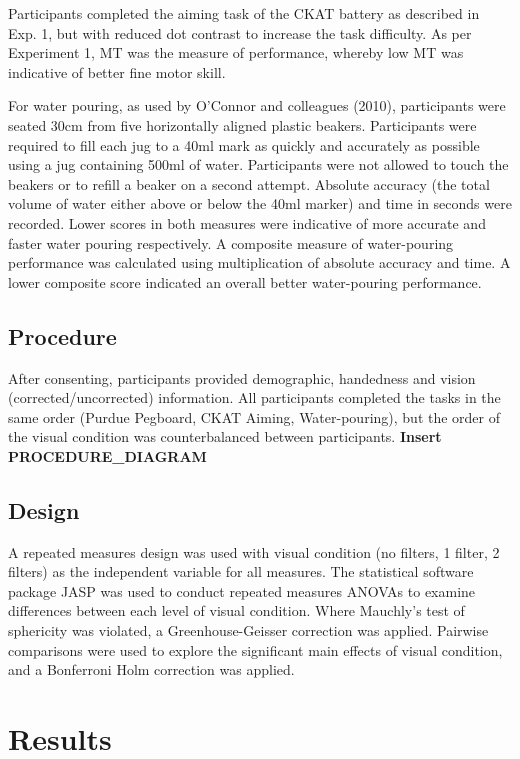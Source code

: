 \documentclass[
  english,
  man,floatsintext]{apa6}
\begin{document}
Participants completed the aiming task of the CKAT battery as described in Exp. 1, but with reduced dot contrast to increase the task difficulty.
As per Experiment 1, MT was the measure of performance, whereby low MT was indicative of better fine motor skill.

For water pouring, as used by O'Connor and colleagues (2010), participants were seated 30cm from five horizontally aligned plastic beakers.
Participants were required to fill each jug to a 40ml mark as quickly and accurately as possible using a jug containing 500ml of water.
Participants were not allowed to touch the beakers or to refill a beaker on a second attempt.
Absolute accuracy (the total volume of water either above or below the 40ml marker) and time in seconds were recorded.
Lower scores in both measures were indicative of more accurate and faster water pouring respectively.
A composite measure of water-pouring performance was calculated using multiplication of absolute accuracy and time.
A lower composite score indicated an overall better water-pouring performance.

\hypertarget{procedure-1}{%
\subsection{Procedure}\label{procedure-1}}

After consenting, participants provided demographic, handedness and vision (corrected/uncorrected) information.
All participants completed the tasks in the same order (Purdue Pegboard, CKAT Aiming, Water-pouring), but the order of the visual condition was counterbalanced between participants.
\textbf{Insert PROCEDURE\_DIAGRAM}

\hypertarget{design-1}{%
\subsection{Design}\label{design-1}}

A repeated measures design was used with visual condition (no filters, 1 filter, 2 filters) as the independent variable for all measures.
The statistical software package JASP was used to conduct repeated measures ANOVAs to examine differences between each level of visual condition.
Where Mauchly's test of sphericity was violated, a Greenhouse-Geisser correction was applied.
Pairwise comparisons were used to explore the significant main effects of visual condition, and a Bonferroni Holm correction was applied.

\hypertarget{results-1}{%
\section{Results}\label{results-1}}
\end{document}
